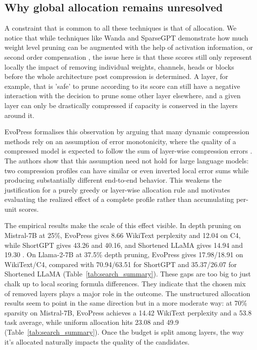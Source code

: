 \subsection{Why global allocation remains unresolved}
\label{subsec:local_ranking_high_compression}

A constraint that is common to all these techniques is that of allocation. We notice that while techniques like Wanda and SparseGPT demonstrate how much weight level pruning can be augmented with the help of activation information, or second order compensation \cite{sun2023simple,frantar2023sparsegpt}, the issue here is that these scores still only represent locally the impact of removing individual weights, channels, heads or blocks before the whole architecture post compression is determined. A layer, for example, that is 'safe' to prune according to its score can still have a negative interaction with the decision to prune some other layer elsewhere, and a given layer can only be drastically compressed if capacity is conserved in the layers around it.

EvoPress formalises this observation by arguing that many dynamic compression methods rely on an assumption of error monotonicity, where the quality of a compressed model is expected to follow the sum of layer-wise compression errors \cite{evopress2024}. The authors show that this assumption need not hold for large language models: two compression profiles can have similar or even inverted local error sums while producing substantially different end-to-end behavior. This weakens the justification for a purely greedy or layer-wise allocation rule and motivates evaluating the realized effect of a complete profile rather than accumulating per-unit scores.

The empirical results make the scale of this effect visible. In depth pruning on Mistral-7B at 25\%, EvoPress gives 8.66 WikiText perplexity and 12.04 on C4, while ShortGPT gives 43.26 and 40.16, and Shortened LLaMA gives 14.94 and 19.30 \cite{evopress2024}. On Llama-2-7B at 37.5\% depth pruning, EvoPress gives 17.98/18.91 on WikiText/C4, compared with 70.94/63.51 for ShortGPT and 35.37/26.07 for Shortened LLaMA (Table~\ref{tab:search_summary}). These gaps are too big to just chalk up to local scoring formula differences. They indicate that the chosen mix of removed layers plays a major role in the outcome. The unstructured allocation results seem to point in the same direction but in a more moderate way: at 70\% sparsity on Mistral-7B, EvoPress achieves a 14.42 WikiText perplexity and a 53.8 task average, while uniform allocation hits 23.08 and 49.9 (Table~\ref{tab:search_summary}). Once the budget is split among layers, the way it’s allocated naturally impacts the quality of the candidates.

